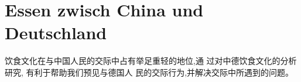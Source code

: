 \chapter{Essen zwisch China und Deutschland}


饮食文化在与中国人民的交际中占有举足重轻的地位,通	过对中德饮食文化的分析研究,	有利于帮助我们预见与德国人	民的交际行为,并解决交际中所遇到的问题。

